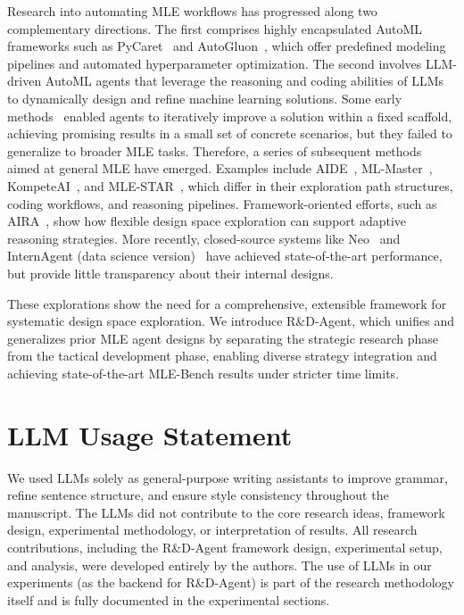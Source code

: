 Research into automating MLE workflows has progressed along two complementary directions. The first comprises highly encapsulated AutoML frameworks such as PyCaret~\citep{pycaret} and AutoGluon~\citep{AutoGluon1,AutoGluon2}, which offer predefined modeling pipelines and automated hyperparameter optimization.
The second involves LLM-driven AutoML agents that leverage the reasoning and coding abilities of LLMs to dynamically design and refine machine learning solutions.
Some early methods~\citep{jing2024dsbench} enabled agents to iteratively improve a solution within a fixed scaffold, achieving promising results in a small set of concrete scenarios, but they failed to generalize to broader MLE tasks. Therefore, a series of subsequent methods aimed at general MLE have emerged. Examples include AIDE~\citep{aide2025}, ML-Master~\citep{liu2025ml}, KompeteAI~\citep{kulibaba2025kompeteai}, and MLE-STAR~\citep{nam2025mle}, which differ in their exploration path structures, coding workflows, and reasoning pipelines. Framework-oriented efforts, such as AIRA~\citep{toledo2025ai}, show how flexible design space exploration can support adaptive reasoning strategies. More recently, closed-source systems like Neo~\citep{neo2025} and InternAgent (data science version)~\citep{team2025novelseek} have achieved state-of-the-art performance, but provide little transparency about their internal designs.  

These explorations show the need for a comprehensive, extensible framework for systematic design space exploration.  We introduce R\&D-Agent, which unifies and generalizes prior MLE agent designs by separating the strategic research phase from the tactical development phase, enabling diverse strategy integration and achieving state-of-the-art MLE-Bench results under stricter time limits.


\section{LLM Usage Statement}
We used LLMs solely as general-purpose writing assistants to improve grammar, refine sentence structure, and ensure style consistency throughout the manuscript. The LLMs did not contribute to the core research ideas, framework design, experimental methodology, or interpretation of results. All research contributions, including the R\&D-Agent framework design, experimental setup, and analysis, were developed entirely by the authors. The use of LLMs in our experiments (as the backend for R\&D-Agent) is part of the research methodology itself and is fully documented in the experimental sections.



